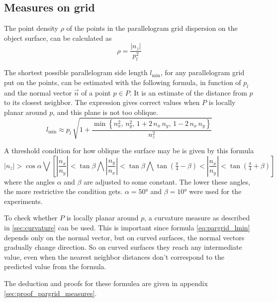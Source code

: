 \subsection{Measures on grid}
The point density $\rho$ of the points in the parallelogram grid dispersion on the object surface, can be calculated as
\begin{equation}
\rho = \frac{| n_z |}{p^2_l}
\end{equation}

The shortest possible parallelogram side length $l_{\text{min}}$, for any parallelogram grid put on the points, can be estimated with the following formula, in function of $p_l$ and the normal vector $\vec{n}$ of a point $p \in P$. It is an estimate of the distance from $p$ to its closest neighbor. The expression gives correct values when $P$ is locally planar around $p$, and this plane is not too oblique.
\begin{equation} \label{eq:pargrid_lmin}
l_{\text{min}} \approx p_l \, \sqrt{1 + \frac{\min \left\{
	n^2_x, \,
	n^2_y, \,
	1 + 2 \, n_x \, n_y, \,
	1 - 2 \, n_x \, n_y
\right\} }{n^2_z}}
\end{equation}

A threshold condition for how oblique the surface may be is given by this formula
\begin{equation} \label{eq:pargrid_lmin_cond}
|n_z| > \cos \alpha \bigvee
\left[
\left|\frac{n_x}{n_y}\right| < \tan \beta
\bigwedge \left|\frac{n_y}{n_x}\right| < \tan \beta
\bigwedge \tan \left(\tfrac{\pi}{4} - \beta\right) < \left|\frac{n_x}{n_y}\right| < \tan \left(\tfrac{\pi}{4} + \beta \right)
\right]
\end{equation}
where the angles $\alpha$ and $\beta$ are adjusted to some constant. The lower these angles, the more restrictive the condition gets. $\alpha = 50\si{\degree}$ and $\beta = 10\si{\degree}$ were used for the experiments.

To check whether $P$ is locally planar around $p$, a curvature measure as described in \ref{sec:curvature} can be used. This is important since formula \ref{eq:pargrid_lmin} depends only on the normal vector, but on curved surfaces, the normal vectors gradually change direction. So on curved surfaces they reach any intermediate value, even when the nearest neighbor distances don't correspond to the predicted value from the formula.

The deduction and proofs for these formulea are given in appendix \ref{sec:proof_pargrid_measures}.




